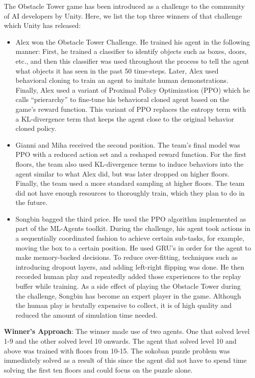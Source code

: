 \documentclass[conference]{IEEEtran}
\begin{document}
The Obstacle Tower game has been introduced as a challenge to the community of AI developers by Unity. Here, we list the top three winners of that challenge which Unity has released:
\begin{itemize}
\item Alex won the Obstacle Tower Challenge. He trained his agent in the following manner: First, he trained a classifier to identify objects such as boxes, doors, etc., and then this classifier was used throughout the process to tell the agent what objects it has seen in the past 50 time-steps. Later, Alex used behavioral cloning to train an agent to imitate human demonstrations. Finally, Alex used a variant of Proximal Policy Optimization (PPO) which he calls “prierarchy” to fine-tune his behavioral cloned agent based on the game’s reward function. This variant of PPO replaces the entropy term with a KL-divergence term that keeps the agent close to the original behavior cloned policy.
\item Gianni and Miha received the second position. The team’s final model was PPO with a reduced action set and a reshaped reward function. For the first floors, the team also used KL-divergence terms to induce behaviors into the agent similar to what Alex did, but was later dropped on higher floors. Finally, the team used a more standard sampling at higher floors. The team did not have enough resources to thoroughly train, which they plan to do in the future.
\item Songbin bagged the third price. He used the PPO algorithm implemented as part of the ML-Agents toolkit. During the challenge, his agent took actions in a sequentially coordinated fashion to achieve certain sub-tasks, for example, moving the box to a certain position. He used GRU's in order for the agent to make memory-backed decisions. To reduce over-fitting, techniques such as introducing dropout layers, and adding left-right flipping was done. He then recorded human play and repeatedly added those experiences to the replay buffer while training. As a side effect of playing the Obstacle Tower during the challenge, Songbin has become an expert player in the game. Although the human play is brutally expensive to collect, it is of high quality and reduced the amount of simulation time needed.
\end{itemize}

\textbf{Winner’s Approach}: The winner made use of two agents. One that solved level 1-9 and the other solved level 10 onwards. The agent that solved level 10 and above was trained with floors from 10-15. The sokoban puzzle problem was immediately solved as a result of this since the agent did not have to spend time solving the first ten floors and could focus on the puzzle alone.
\end{document}
